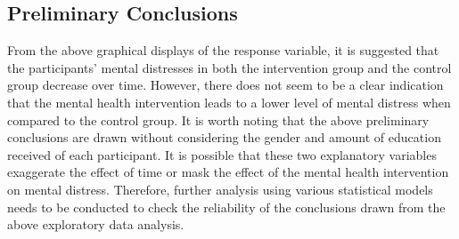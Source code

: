 \subsection{Preliminary Conclusions}
From the above graphical displays of the response variable, it is suggested that the participants' mental distresses in both the intervention group and the control group decrease over time. However, there does not seem to be a clear indication that the mental health intervention leads to a lower level of mental distress when compared to the control group. It is worth noting that the above preliminary conclusions are drawn without considering the gender and amount of education received of each participant. It is possible that these two explanatory variables exaggerate the effect of time or mask the effect of the mental health intervention on mental distress. Therefore, further analysis using various statistical models needs to be conducted to check the reliability of the conclusions drawn from the above exploratory data analysis.